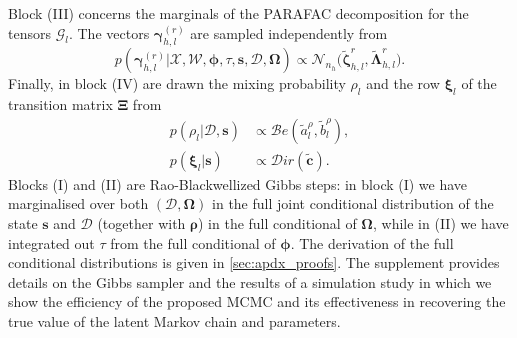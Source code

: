 \documentclass[12pt,a4paper]{article}
\theoremstyle{custom}
\begin{document}
Block (III) concerns the marginals of the PARAFAC decomposition for the tensors $\mathcal{G}_l$. The vectors $\boldsymbol{\gamma}_{h,l}^{(r)}$ are sampled independently from
\begin{equation}
p(\boldsymbol{\gamma}_{h,l}^{(r)} | \mathcal{X}, \mathcal{W}, \boldsymbol{\phi}, \tau, \mathbf{s}, \mathcal{D}, \boldsymbol{\Omega}) \propto \mathcal{N}_{n_h}\Big( \tilde{\boldsymbol{\zeta}}_{h,l}^r, \tilde{\boldsymbol{\Lambda}}_{h,l}^r \Big).
\label{eq:posterior_gamma}
\end{equation}
Finally, in block (IV) are drawn the mixing probability $\rho_l$ and the row $\boldsymbol{\xi}_l$ of the transition matrix $\boldsymbol{\Xi}$ from
\begin{align}
\label{eq:posterior_rho}
p(\rho_l | \mathcal{D}, \mathbf{s}) & \propto \mathcal{B}e(\tilde{a}_l^\rho, \tilde{b}_l^\rho), \\
\label{eq:posterior_xi}
p(\boldsymbol{\xi}_l|\mathbf{s}) & \propto \mathcal{D}ir(\tilde{\mathbf{c}}).
\end{align}
Blocks (I) and (II) are Rao-Blackwellized Gibbs steps: in block (I) we have marginalised over both $(\mathcal{D},\boldsymbol{\Omega})$ in the full joint conditional distribution of the state $\mathbf{s}$ and $\mathcal{D}$ (together with $\boldsymbol{\rho}$) in the full conditional of $\boldsymbol{\Omega}$, while in (II) we have integrated out $\tau$ from the full conditional of $\boldsymbol{\phi}$. The derivation of the full conditional distributions is given in \autoref{sec:apdx_proofs}.
The supplement provides details on the Gibbs sampler and the results of a simulation study in which we show the efficiency of the proposed MCMC and its effectiveness in recovering the true value of the latent Markov chain and parameters.
\end{document}
